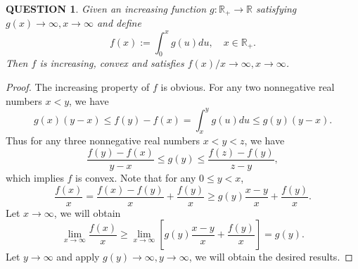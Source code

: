 \documentclass[12pt]{article}
\renewcommand{\(}{\left(}%
\renewcommand{\)}{\right)}%
\renewcommand{\[}{\left[}%
\renewcommand{\]}{\right]}%
\renewcommand{\r}{\mathbb{R}}
\newtheorem{question}{QUESTION}[section]}
\newtheorem{proof}{Proof.}}
\begin{document}
  \begin{question}
  	Given an increasing function $g:\r_+\to\r$ satisfying $g(x)\to\infty,x\to\infty$ and define 
  	\begin{equation*}
  		f(x):=\int_0^x g(u)du,\quad x\in\r_+.
  	\end{equation*}
  	Then $f$ is increasing, convex and satisfies $f(x)/x\to\infty,x\to\infty$.
  \end{question}
  \begin{proof}
  	The increasing property of $f$ is obvious. For any two nonnegative real numbers $x<y$, we have
  	\begin{equation*}
  		g(x)(y-x)\leq f(y)-f(x)=\int_x^yg(u)du\leq g(y)(y-x).
  	\end{equation*}
  	Thus for any three nonnegative real numbers $x<y<z$, we have
  	\begin{equation*}
  		\frac{f(y)-f(x)}{y-x}\leq g(y)\leq \frac{f(z)-f(y)}{z-y},
  	\end{equation*}
  	which implies $f$ is convex. Note that for any $0\leq y<x$,
  	\begin{equation*}
  		\frac{f(x)}{x}=\frac{f(x)-f(y)}{x}+\frac{f(y)}{x}\geq g(y)\frac{x-y}{x}+\frac{f(y)}{x}.
  	\end{equation*}
  	Let $x\to\infty$, we will obtain 
  	\begin{equation*}
  		\lim_{x\to\infty}\frac{f(x)}{x}\geq \lim_{x\to\infty}\[g(y)\frac{x-y}{x}+\frac{f(y)}{x}\]=g(y).
  	\end{equation*}
  	Let $y\to\infty$ and apply $g(y)\to\infty,y\to\infty$, we will obtain the desired results.
  \end{proof}
  
\end{document}
